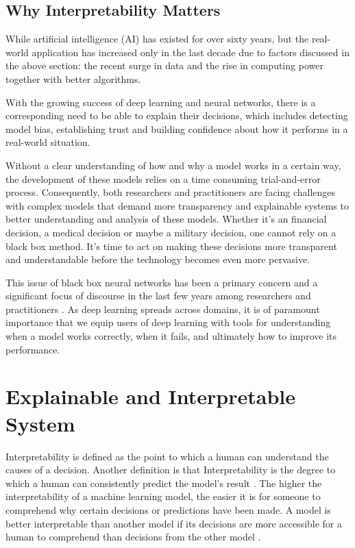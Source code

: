 \subsection{Why Interpretability Matters}

While artificial intelligence (AI) has existed for over sixty years, but the real-world application has increased only in the last decade due to factors discussed in the above section: the recent surge in data and the rise in computing power together with better algorithms.

With the growing success of deep learning and neural networks, there is a corresponding need to be able to explain their decisions, which includes detecting model bias, establishing trust and building confidence about how it performs in a real-world situation.

Without a clear understanding of how and why a model works in a certain way, the development of these models relies on a time consuming trial-and-error process. Consequently, both researchers and practitioners are facing challenges with complex models that demand more transparency and explainable systems to better understanding and analysis of these models. Whether it's an financial decision, a medical decision or maybe a military decision, one cannot rely on a black box method. It's time to act on making these decisions more transparent and understandable before the technology becomes even more pervasive.

This issue of black box neural networks has been a primary concern and a significant focus of discourse in the last few years among researchers and practitioners \cite{Samek}. As deep learning spreads across domains, it is of paramount importance that we equip users of deep learning with tools for understanding when a model works correctly, when it fails, and ultimately how to improve its performance.

\section{Explainable and Interpretable System}

Interpretability is defined as the point to which a human can understand the causes of a decision. Another definition is that Interpretability is the degree to which a human can consistently predict the model’s result \cite{molnar}. The higher the interpretability of a machine learning model, the easier it is for someone to comprehend why certain decisions or predictions have been made. A model is better interpretable than another model if its decisions are more accessible for a human to comprehend than decisions from the other model \cite{molnar}.
    
